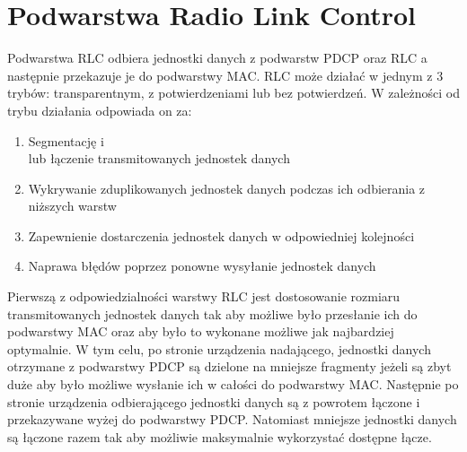 \chapter{Podwarstwa Radio Link Control}
\label{cha:rlc}

Podwarstwa RLC odbiera jednostki danych z podwarstw PDCP oraz RLC a następnie przekazuje je do podwarstwy MAC. RLC może działać w jednym z 3 trybów: transparentnym, z potwierdzeniami lub bez potwierdzeń. W zależności od trybu działania odpowiada on za:

\begin{enumerate}
	\item Segmentację i\\lub łączenie transmitowanych jednostek danych
	\item Wykrywanie zduplikowanych jednostek danych podczas ich odbierania z niższych warstw
	\item Zapewnienie dostarczenia jednostek danych w odpowiedniej kolejności
	\item Naprawa błędów poprzez ponowne wysyłanie jednostek danych
\end{enumerate}

Pierwszą z odpowiedzialności warstwy RLC jest dostosowanie rozmiaru transmitowanych jednostek danych tak aby możliwe było przesłanie ich do podwarstwy MAC oraz aby było to wykonane możliwe jak najbardziej optymalnie. W tym celu, po stronie urządzenia nadającego, jednostki danych otrzymane z podwarstwy PDCP są dzielone na mniejsze fragmenty jeżeli są zbyt duże aby było możliwe wysłanie ich w całości do podwarstwy MAC. Następnie po stronie urządzenia odbierającego jednostki danych są z powrotem łączone i przekazywane wyżej do podwarstwy PDCP. Natomiast mniejsze jednostki danych są łączone razem tak aby możliwie maksymalnie wykorzystać dostępne łącze. 